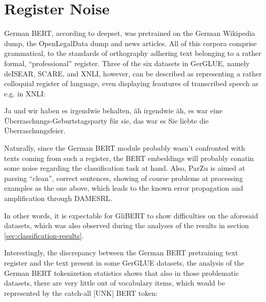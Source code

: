 \section{Register Noise}
\label{sec:register-noise}

German BERT, according to deepset, was pretrained on the German Wikipedia dump, the OpenLegalData dump and
news articles. All of this corpora comprise grammatical, to the standards of orthography adhering text
belonging to a rather formal, ``professional'' register. Three of the six datasets in GerGLUE, namely
deISEAR, SCARE, and XNLI, however, can be described as representing a rather colloquial register of
language, even displaying feautures of transcribed speech as e.g. in XNLI:

\begin{examples}
  \item Ja und wir haben es irgendwie behalten, äh irgendwie äh, es war eine Überraschungs-Geburtstagsparty für sie, das war es Sie liebte die Überraschungsfeier.
\end{examples}

Naturally, since the German BERT module probably wasn't confronted with texts coming from such a register,
the BERT embeddings will probably conatin some noise regarding the classification task at hand. Also, ParZu
is aimed at parsing ``clean'', correct sentences, showing of course problems at processing examples as the
one above, which leads to the known error propagation and amplification through DAMESRL.

In other words, it is expectable for GliBERT to show difficulties on the aforesaid datasets, which
was also observed during the analyses of the results in section \ref{sec:classification-results}.

Interestingly, the discrepancy between the German BERT pretraining text register and the text
present in some GerGLUE datasets, the analysis of the German BERT tokenizetion statistics shows
that also in those problematic datasets, there are very little out of vocabulary items, which
would be represented by the catch-all [UNK] BERT token:

